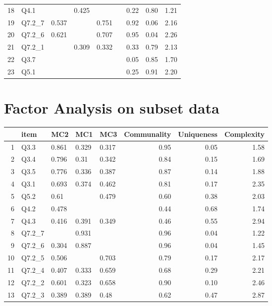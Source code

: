 \documentclass[../main.tex]{subfiles}
\begin{document}
\begin{table}[ht]
\begin{tabular}{rlllllrrr}
                    18 & Q4.1 &  & 0.425 &  &  & 0.22 & 0.80 & 1.21 \\
                    19 & Q7.2\_7 & 0.537 &  & 0.751 &  & 0.92 & 0.06 & 2.16 \\
                    20 & Q7.2\_6 & 0.621 &  & 0.707 &  & 0.95 & 0.04 & 2.26 \\
                    21 & Q7.2\_1 &  & 0.309 & 0.332 &  & 0.33 & 0.79 & 2.13 \\
                    22 & Q3.7 &  &  &  &  & 0.05 & 0.85 & 1.70 \\
                    23 & Q5.1 &  &  &  &  & 0.25 & 0.91 & 2.20 \\
                    \hline
                \end{tabular}
            \end{table}

        \section{Factor Analysis on subset data}

            \begin{table}[ht]
                \centering
                \begin{tabular}{rllllrrr}
                    \hline
                    & item & MC2 & MC1 & MC3 & Communality & Uniqueness & Complexity \\
                    \hline
                    1 & Q3.3 & 0.861 & 0.329 & 0.317 & 0.95 & 0.05 & 1.58 \\
                    2 & Q3.4 & 0.796 & 0.31 & 0.342 & 0.84 & 0.15 & 1.69 \\
                    3 & Q3.5 & 0.776 & 0.336 & 0.387 & 0.87 & 0.14 & 1.88 \\
                    4 & Q3.1 & 0.693 & 0.374 & 0.462 & 0.81 & 0.17 & 2.35 \\
                    5 & Q5.2 & 0.61 &  & 0.479 & 0.60 & 0.38 & 2.03 \\
                    6 & Q4.2 & 0.478 &  &  & 0.44 & 0.68 & 1.74 \\
                    7 & Q4.3 & 0.416 & 0.391 & 0.349 & 0.46 & 0.55 & 2.94 \\
                    8 & Q7.2\_7 &  & 0.931 &  & 0.96 & 0.04 & 1.22 \\
                    9 & Q7.2\_6 & 0.304 & 0.887 &  & 0.96 & 0.04 & 1.45 \\
                    10 & Q7.2\_5 & 0.506 &  & 0.703 & 0.79 & 0.17 & 2.17 \\
                    11 & Q7.2\_4 & 0.407 & 0.333 & 0.659 & 0.68 & 0.29 & 2.21 \\
                    12 & Q7.2\_2 & 0.601 & 0.323 & 0.658 & 0.90 & 0.10 & 2.46 \\
                    13 & Q7.2\_3 & 0.389 & 0.389 & 0.48 & 0.62 & 0.47 & 2.87 \\
                    \hline
                \end{tabular}
            \end{table}
\end{document}
